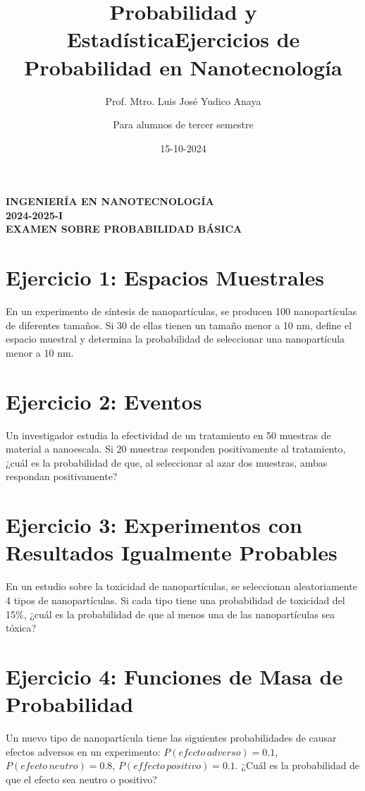 \documentclass[a4paper,openright,10pt]{article}
\begin{document}
\title{Probabilidad y Estadística}
\author{Prof. Mtro. Luis Jos\'{e} Yudico Anaya}
\date{15-10-2024}
\maketitle

\begin{center}
\textbf{INGENIERÍA EN NANOTECNOLOGÍA}\\
\vspace{.5cm}
\textbf{2024-2025-I}\\
\vspace{.5cm}
\textbf{EXAMEN SOBRE PROBABILIDAD BÁSICA}
\end{center}


\title{Ejercicios de Probabilidad en Nanotecnología}
\author{Para alumnos de tercer semestre}
\date{}
\maketitle

\section*{Ejercicio 1: Espacios Muestrales}
En un experimento de síntesis de nanopartículas, se producen 100 nanopartículas de diferentes tamaños. Si 30 de ellas tienen un tamaño menor a 10 nm, define el espacio muestral y determina la probabilidad de seleccionar una nanopartícula menor a 10 nm.

\section*{Ejercicio 2: Eventos}
Un investigador estudia la efectividad de un tratamiento en 50 muestras de material a nanoescala. Si 20 muestras responden positivamente al tratamiento, ¿cuál es la probabilidad de que, al seleccionar al azar dos muestras, ambas respondan positivamente?

\section*{Ejercicio 3: Experimentos con Resultados Igualmente Probables}
En un estudio sobre la toxicidad de nanopartículas, se seleccionan aleatoriamente 4 tipos de nanopartículas. Si cada tipo tiene una probabilidad de toxicidad del 15\%, ¿cuál es la probabilidad de que al menos una de las nanopartículas sea tóxica?

\section*{Ejercicio 4: Funciones de Masa de Probabilidad}
Un nuevo tipo de nanopartícula tiene las siguientes probabilidades de causar efectos adversos en un experimento: \( P(efecto \, adverso) = 0.1 \), \( P(efecto \, neutro) = 0.8 \), \( P(effecto \, positivo) = 0.1 \). ¿Cuál es la probabilidad de que el efecto sea neutro o positivo?
\end{document}
